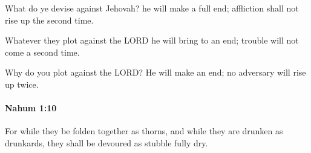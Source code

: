 			\begin{versebox}
					\item[BHS] 
					\item[LXX] 
					\item[ASV] What do ye devise against Jehovah? he will make a full end; affliction shall not rise up the second time.
					\item[NIV] Whatever they plot against the LORD he will bring to an end; trouble will not come a second time.
					\item[NRSV] Why do you plot against the LORD? He will make an end; no adversary will rise up twice.
			\end{versebox}

		\paragraph{Nahum 1:10} %
			\label{NAHUM-1-10}

			For while they be folden together as thorns, and while they are drunken as drunkards, they shall be devoured as stubble fully dry.

